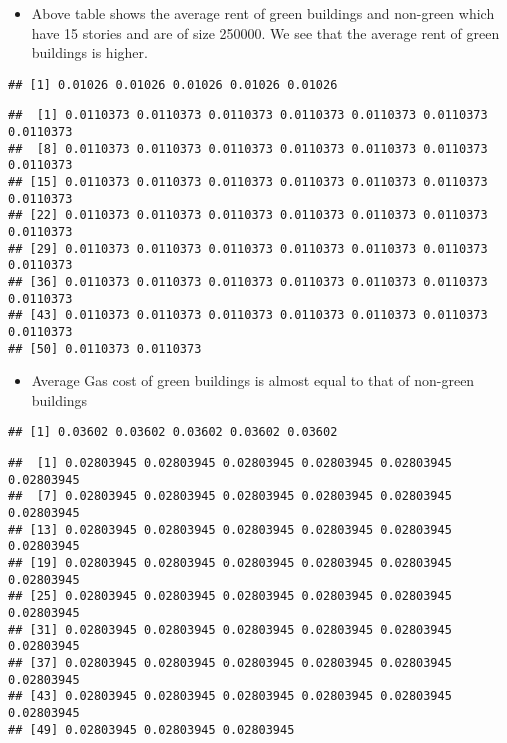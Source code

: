 \documentclass[
  12pt,
]{article}
\providecommand{\tightlist}{%
  \setlength{\itemsep}{0pt}\setlength{\parskip}{0pt}}
\begin{document}
\begin{itemize}
\tightlist
\item
  Above table shows the average rent of green buildings and non-green
  which have 15 stories and are of size 250000. We see that the average
  rent of green buildings is higher.
\end{itemize}

\begin{verbatim}
## [1] 0.01026 0.01026 0.01026 0.01026 0.01026
\end{verbatim}

\begin{verbatim}
##  [1] 0.0110373 0.0110373 0.0110373 0.0110373 0.0110373 0.0110373 0.0110373
##  [8] 0.0110373 0.0110373 0.0110373 0.0110373 0.0110373 0.0110373 0.0110373
## [15] 0.0110373 0.0110373 0.0110373 0.0110373 0.0110373 0.0110373 0.0110373
## [22] 0.0110373 0.0110373 0.0110373 0.0110373 0.0110373 0.0110373 0.0110373
## [29] 0.0110373 0.0110373 0.0110373 0.0110373 0.0110373 0.0110373 0.0110373
## [36] 0.0110373 0.0110373 0.0110373 0.0110373 0.0110373 0.0110373 0.0110373
## [43] 0.0110373 0.0110373 0.0110373 0.0110373 0.0110373 0.0110373 0.0110373
## [50] 0.0110373 0.0110373
\end{verbatim}

\begin{itemize}
\tightlist
\item
  Average Gas cost of green buildings is almost equal to that of
  non-green buildings
\end{itemize}

\begin{verbatim}
## [1] 0.03602 0.03602 0.03602 0.03602 0.03602
\end{verbatim}

\begin{verbatim}
##  [1] 0.02803945 0.02803945 0.02803945 0.02803945 0.02803945 0.02803945
##  [7] 0.02803945 0.02803945 0.02803945 0.02803945 0.02803945 0.02803945
## [13] 0.02803945 0.02803945 0.02803945 0.02803945 0.02803945 0.02803945
## [19] 0.02803945 0.02803945 0.02803945 0.02803945 0.02803945 0.02803945
## [25] 0.02803945 0.02803945 0.02803945 0.02803945 0.02803945 0.02803945
## [31] 0.02803945 0.02803945 0.02803945 0.02803945 0.02803945 0.02803945
## [37] 0.02803945 0.02803945 0.02803945 0.02803945 0.02803945 0.02803945
## [43] 0.02803945 0.02803945 0.02803945 0.02803945 0.02803945 0.02803945
## [49] 0.02803945 0.02803945 0.02803945
\end{verbatim}
\end{document}
